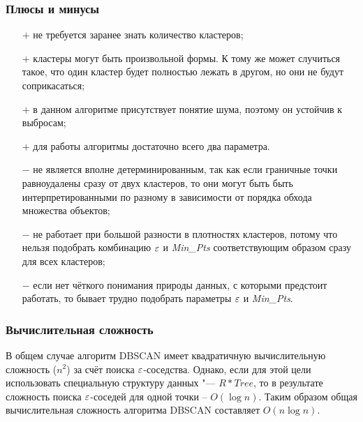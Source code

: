 \subsubsection{Плюсы и минусы}
\begin{itemize}
\item[$+$] не требуется заранее знать количество кластеров;
\item[$+$] кластеры могут быть произвольной формы. К тому же может случиться такое, что один кластер будет полностью лежать в другом, но они не будут соприкасаться;
\item[$+$] в данном алгоритме присутствует понятие шума, поэтому он устойчив к выбросам;
\item[$+$] для работы алгоритмы достаточно всего два параметра.
\end{itemize}
\begin{itemize}
\item[$-$] не является вполне детерминированным, так как если граничные точки равноудалены сразу от двух кластеров, то они могут быть быть интерпретированными по разному в зависимости от порядка обхода множества объектов;
\item[$-$] не работает при большой разности в плотностях кластеров, потому что нельзя подобрать комбинацию $\varepsilon$ и {\it Min\_Pts} соответствующим образом сразу для всех кластеров;
\item[$-$] если нет чёткого понимания природы данных, с которыми предстоит работать, то бывает трудно подобрать параметры $\varepsilon$ и {\it Min\_Pts}.
\end{itemize}

\subsubsection{Вычислительная сложность}
В общем случае алгоритм DBSCAN имеет квадратичную вычислительную сложность ({\bf $n^2$}) за счёт поиска $\varepsilon$-соседства. Однако, если для этой цели использовать специальную структуру данных "--- $R*Tree$, то в результате сложность поиска $\varepsilon$-соседей для одной точки – $O(\log n)$. Таким образом общая вычислительная сложность алгоритма DBSCAN составляет {\bf $O(n \log n)$}.

